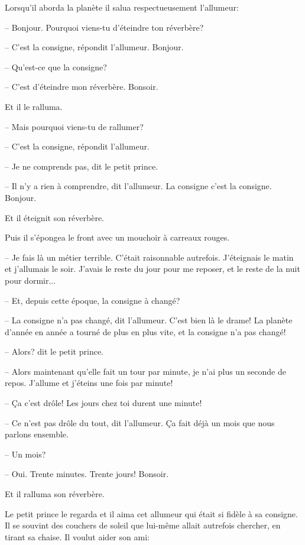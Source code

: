 \documentclass[a4paper]{report}
\begin{document}
Lorsqu'il aborda la planète il salua respectueusement l'allumeur:

-- Bonjour. Pourquoi viens-tu d'éteindre ton réverbère?


-- C'est la consigne, répondit l'allumeur. Bonjour.

-- Qu'est-ce que la consigne?

-- C'est d'éteindre mon réverbère. Bonsoir.

Et il le ralluma.

-- Mais pourquoi viens-tu de rallumer?

-- C'est la consigne, répondit l'allumeur.

-- Je ne comprends pas, dit le petit prince.

-- Il n'y a rien à comprendre, dit l'allumeur. La consigne c'est la consigne. Bonjour.

Et il éteignit son réverbère.

Puis il s'épongea le front avec un mouchoir à carreaux rouges.

-- Je fais là un métier terrible. C'était raisonnable autrefois. J'éteignais le matin et j'allumais le soir. J'avais le reste du jour pour me reposer, et le reste de la nuit pour dormir...

-- Et, depuis cette époque, la consigne à changé?

-- La consigne n'a pas changé, dit l'allumeur. C'est bien là le drame! La planète d'année en année a tourné de plus en plus vite, et la consigne n'a pas changé!

-- Alors? dit le petit prince.

-- Alors maintenant qu'elle fait un tour par minute, je n'ai plus un seconde de repos. J'allume et j'éteins une fois par minute!

-- Ça c'est drôle! Les jours chez toi durent une minute!

-- Ce n'est pas drôle du tout, dit l'allumeur. Ça fait déjà un mois que nous parlons ensemble.

-- Un mois?

-- Oui. Trente minutes. Trente jours! Bonsoir.

Et il ralluma son réverbère.

Le petit prince le regarda et il aima cet allumeur qui était si fidèle à sa consigne. Il se souvint des couchers de soleil que lui-même allait autrefois chercher, en tirant sa chaise. Il voulut aider son ami:
\end{document}
